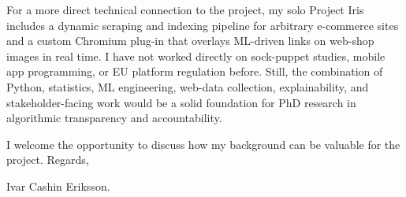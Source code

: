 \documentclass[11pt,a4paper]{moderncv}
\begin{document}
\hspace*{2em}
For a more direct technical connection to the project, my solo Project Iris includes a dynamic scraping and indexing pipeline for arbitrary e-commerce sites and a custom Chromium plug-in that overlays ML-driven links on web-shop images in real time. I have not worked directly on sock-puppet studies, mobile app programming, or EU platform regulation before. Still, the combination of Python, statistics, ML engineering, web-data collection, explainability, and stakeholder-facing work would be a solid foundation for PhD research in algorithmic transparency and accountability.

\vspace*{2em}
I welcome the opportunity to discuss how my background can be valuable for the project. Regards,

\vspace*{1em}
Ivar Cashin Eriksson.
\end{document}
